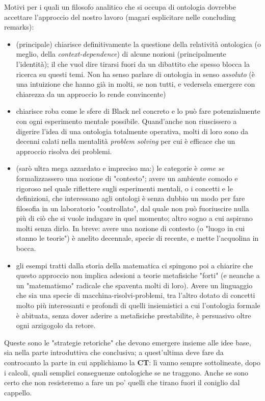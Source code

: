 \documentclass[a4paper, 11pt]{article}
\begin{document}
Motivi per i quali un filosofo analitico che si occupa di ontologia dovrebbe accettare l'approccio del nostro lavoro (magari esplicitare nelle concluding remarks):
\begin{itemize}
	\item (principale) chiarisce definitivamente la questione della relatività ontologica (o meglio, della \emph{context-dependence}) di alcune nozioni (principalmente l'identità); il che vuol dire tirarsi fuori da un dibattito che spesso blocca la ricerca su questi temi. Non ha senso parlare di ontologia in senso \emph{assoluto} (è una intuizione che hanno già in molti, se non tutti, e vedersela emergere con chiarezza da un approccio lo rende convincente)
	\item chiarisce roba come le sfere di Black nel concreto e lo può fare potenzialmente con ogni esperimento mentale possibile. Quand'anche non riuscissero a digerire l'idea di una ontologia totalmente operativa, molti di loro sono da decenni calati nella mentalità \emph{problem solving} per cui è efficace che un approccio risolva dei problemi.
	\item (sarò ultra mega azzardato e impreciso ma:) le categorie è \emph{come se} formalizzassero una nozione di "contesto"; avere un ambiente comodo e rigoroso nel quale riflettere sugli esperimenti mentali, o i concetti e le definizioni, che interessano agli ontologi è senza dubbio un modo per fare filosofia in un laboratorio "controllato", dal quale non può fuoriuscire nulla più di ciò che si vuole indagare in quel momento; altro sogno a cui aspirano molti senza dirlo. In breve: avere una nozione di contesto (o "luogo in cui stanno le teorie") è anelito decennale, specie di recente, e mette l'acquolina in bocca. 
	\item gli esempi tratti dalla storia della matematica ci spingono poi a chiarire che questo approccio non implica adesioni a teorie metafisiche "forti" (e neanche a un "matematismo" radicale che spaventa molti di loro). Avere un linguaggio che sia una specie di macchina-risolvi-problemi, tra l'altro dotato di concetti molto più interessanti e profondi di quelli insiemistici a cui l'ontologia formale è abituata, senza dover aderire a metafisiche prestabilite, è persuasivo oltre ogni arzigogolo da retore.    
\end{itemize} 
Queste sono le "strategie retoriche" che devono emergere insieme alle idee base, sia nella parte introduttiva che conclusiva; a quest'ultima deve fare da controcanto la parte in cui applichiamo la \textbf{CT}: lì vanno sempre sottolineate, dopo i calcoli, quali semplici conseguenze ontologiche se ne traggono. Anche se sono certo che non resisteremo a fare un po' quelli che tirano fuori il coniglio dal cappello. 
\end{document}
